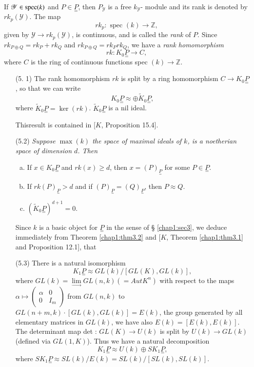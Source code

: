 If $\mathscr{Y} \in  \operatorname{spec} (k)$ and $P \in \underset{=}{P}$, then
$P_{\mathscr{Y}}$ is a free $k_{\mathscr{Y}}$- module and its rank is
denoted by $rk_p (\mathscr{Y})$. The map 
$$
rk_p : \text{ spec } (k) \to \mathbb{Z},
$$
given by $\mathscr{Y} \to rk_p (\mathscr{Y})$, is continuous, and is
called the \textit{rank} of $P$. Since $rk_{P \oplus Q} = rk_P + rk_Q$
and $rk_{P \oplus Q} = rk_P rk_Q$, we have a \textit{rank
  homomorphism} 
$$
rk : K_0 \underset{=}{P} \to C,
$$
where $C$ is the ring of continuous functions spec $(k) \to \mathbb{Z}$.
\begin{itemize}
\item[(5. 1)] The rank homomorphism $rk$ is split by a ring
  homomorphism $C \to K_0 \underset{=}{P}$, so that we can write  
$$
K_0 \underset{=}{P} \approx \oplus \tilde{K}_0 \underset{=}{P},
$$
where $\tilde{K}_0 \underset{=}{P} = \ker (rk)$. $\tilde{K}_0
\underset{=}{P}$ is a nil ideal. 

This\pageoriginale result is contained in [$K$, Proposition 15.4].

\item[(5.2)] \textit{Suppose $\max (k)$ the space of maximal ideals of
  $k$, is a noetherian space of dimension $d$. Then}  
\begin{enumerate}[(a)]
\item If $x \in K_0 \underset{=}{P}$ and $rk (x) \geq d$, then $x =
  (P)_{\underset{=}{P}}$ for some $P \in \underset{=}{P}$. 

\item If $rk (P)_{\underset{=}{P}} > d$ and if $(P)_{\underset{=}{P}}
  = (Q)_{\underset{=}{P}}$, then $P \approx Q$.  

\item $(\tilde{K}_0\underset{=}{P})^{d + 1} =0$.
\end{enumerate}

Since $k$ is a basic object for $\underset{=}{P}$ in the sense of \S
\ref{chap1:sec3}, we deduce immediately from Theorem
\ref{chap1:thm3.2} and [$K$, Theorem \ref{chap1:thm3.1} and
  Proposition 12.1], that   

\item[(5.3)] There is a natural isomorphism 
$$
K_1 \underset{=}{P} \approx GL(k) / [GL(K), GL(k)], 
$$
where $GL(k) = \lim \limits_{\to} GL(n,k) (= Aut K^n)$ with respect
to the maps $\alpha \mapsto \begin{pmatrix} \alpha & 0 \\ 0 &
  I_m \end{pmatrix}$ from $GL(n, k)$ to $GL(n+m , k) \cdot [GL(k) , GL(k)]
= E(k)$, the group generated by all elementary matrices in $GL(k)$, we
have also $E(k) = [E(k), E(k)]$. The determinant map det : $GL(K) \to
U(k)$ is split by $U(k) \to GL(k)$ (defined via $GL(1, K)$). Thus we
have a natural decomposition 
$$
K_1 \underset{=}{P} \approx U(k) \oplus SK_1 \underset{=}{P}, 
$$
where $SK_1 \underset{=}{P}\approx SL(k) / E(k) = SL(k)/[SL(k), SL(k)]$.


\end{itemize}
